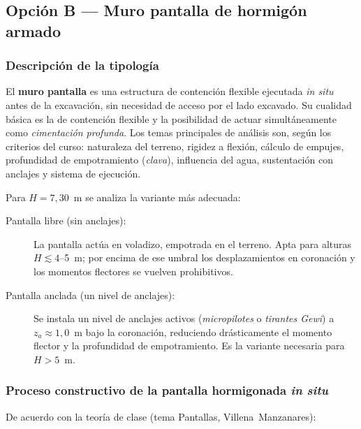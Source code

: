 \subsection{Opción B — Muro pantalla de hormigón armado}
\label{subsec:opcion_pantalla}

\subsubsection{Descripción de la tipología}

El \textbf{muro pantalla} es una estructura de contención flexible ejecutada
\emph{in situ} antes de la excavación, sin necesidad de acceso por el lado
excavado. Su cualidad básica es la de contención flexible y la posibilidad
de actuar simultáneamente como \emph{cimentación profunda}. Los temas
principales de análisis son, según los criterios del curso: naturaleza del
terreno, rigidez a flexión, cálculo de empujes, profundidad de empotramiento
(\emph{clava}), influencia del agua, sustentación con anclajes y sistema de
ejecución.

Para $H = 7{,}30$~m se analiza la variante más adecuada:

\begin{description}
  \item[Pantalla libre (sin anclajes):] La pantalla actúa en voladizo,
  empotrada en el terreno. Apta para alturas $H \lesssim 4$--5~m; por
  encima de ese umbral los desplazamientos en coronación y los momentos
  flectores se vuelven prohibitivos.

  \item[Pantalla anclada (un nivel de anclajes):] Se instala un nivel de
  anclajes activos (\emph{micropilotes} o \emph{tirantes Gewi}) a
  $z_a \approx 1{,}0$~m bajo la coronación, reduciendo drásticamente el
  momento flector y la profundidad de empotramiento. Es la variante
  necesaria para $H > 5$~m.
\end{description}

\subsubsection{Proceso constructivo de la pantalla hormigonada \emph{in situ}}

De acuerdo con la teoría de clase (tema Pantallas, Villena~Manzanares):

